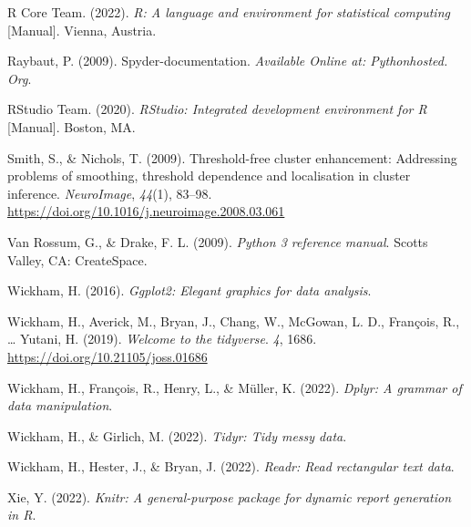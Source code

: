 \documentclass[
  man,floatsintext]{apa6}
\newlength{\cslhangindent}
\newlength{\cslentryspacingunit} %
\newenvironment{CSLReferences}[2] %
 {%
  \setlength{\parindent}{0pt}
  \ifodd #1
  \let\oldpar\par
  \def\par{\hangindent=\cslhangindent\oldpar}
  \fi
  \setlength{\parskip}{#2\cslentryspacingunit}
 }%
 {}
\begin{document}
\begin{CSLReferences}{1}{0}
\leavevmode{}%
R Core Team. (2022). \emph{R: {A} language and environment for statistical computing} {[}Manual{]}. {Vienna, Austria}.

\leavevmode{}%
Raybaut, P. (2009). Spyder-documentation. \emph{Available Online at: Pythonhosted. Org}.

\leavevmode{}%
RStudio Team. (2020). \emph{{RStudio}: {Integrated} development environment for {R}} {[}Manual{]}. {Boston, MA}.

\leavevmode{}%
Smith, S., \& Nichols, T. (2009). Threshold-free cluster enhancement: {Addressing} problems of smoothing, threshold dependence and localisation in cluster inference. \emph{NeuroImage}, \emph{44}(1), 83--98. \url{https://doi.org/10.1016/j.neuroimage.2008.03.061}

\leavevmode{}%
Van Rossum, G., \& Drake, F. L. (2009). \emph{Python 3 reference manual}. {Scotts Valley, CA}: {CreateSpace}.

\leavevmode{}%
Wickham, H. (2016). \emph{Ggplot2: {Elegant} graphics for data analysis}.

\leavevmode{}%
Wickham, H., Averick, M., Bryan, J., Chang, W., McGowan, L. D., François, R., \ldots{} Yutani, H. (2019). \emph{Welcome to the tidyverse}. \emph{4}, 1686. \url{https://doi.org/10.21105/joss.01686}

\leavevmode{}%
Wickham, H., François, R., Henry, L., \& Müller, K. (2022). \emph{Dplyr: {A} grammar of data manipulation}.

\leavevmode{}%
Wickham, H., \& Girlich, M. (2022). \emph{Tidyr: {Tidy} messy data}.

\leavevmode{}%
Wickham, H., Hester, J., \& Bryan, J. (2022). \emph{Readr: {Read} rectangular text data}.

\leavevmode{}%
Xie, Y. (2022). \emph{Knitr: {A} general-purpose package for dynamic report generation in {R}}.

\end{CSLReferences}
\end{document}
